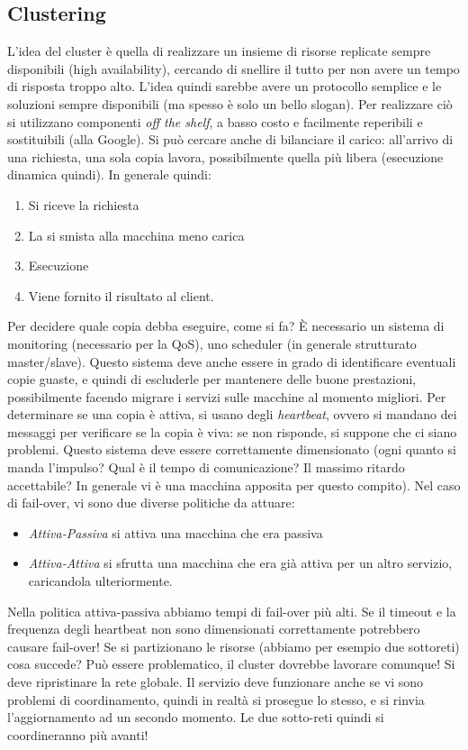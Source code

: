 \subsection{Clustering}
L'idea del cluster è quella di realizzare un insieme di risorse replicate 
sempre disponibili (high availability),
cercando di snellire il tutto per non avere un tempo di risposta troppo alto. 
L'idea quindi sarebbe avere un protocollo
semplice e le soluzioni sempre disponibili (ma spesso è solo un bello slogan).
Per realizzare ciò si utilizzano componenti \textit{off the shelf}, a basso 
costo e facilmente reperibili e
sostituibili (alla Google). Si può cercare anche di bilanciare il carico: 
all'arrivo di una richiesta, una sola copia
lavora, possibilmente quella più libera (esecuzione dinamica quindi). In 
generale quindi:
\begin{enumerate}
 \item Si riceve la richiesta
 \item La si smista alla macchina meno carica
 \item Esecuzione
 \item Viene fornito il risultato al client.
\end{enumerate}
Per decidere quale copia debba eseguire, come si fa? È necessario un sistema di 
monitoring (necessario per la QoS),
uno scheduler (in generale strutturato master/slave). Questo sistema deve anche 
essere in grado di identificare
eventuali copie guaste, e quindi di escluderle per mantenere delle buone 
prestazioni, possibilmente facendo migrare i
servizi sulle macchine al momento migliori. Per determinare se una copia è 
attiva, si usano degli \textit{heartbeat},
ovvero si mandano dei messaggi per verificare se la copia è viva: se non 
risponde, si suppone che ci siano problemi.
Questo sistema deve essere correttamente dimensionato (ogni quanto si manda 
l'impulso? Qual è il tempo di
comunicazione? Il massimo ritardo accettabile? In generale vi è una macchina 
apposita per questo compito).
Nel caso di fail-over, vi sono due diverse politiche da attuare:
\begin{itemize}
 \item \textit{Attiva-Passiva} si attiva una macchina che era passiva
 \item \textit{Attiva-Attiva} si sfrutta una macchina che era già attiva
 per un altro servizio, caricandola ulteriormente.
\end{itemize}
Nella politica attiva-passiva abbiamo tempi di fail-over più alti.
Se il timeout e la frequenza degli heartbeat non sono dimensionati
correttamente potrebbero causare fail-over!
Se si partizionano le risorse (abbiamo per esempio due sottoreti) cosa succede? 
Può essere problematico, il cluster
dovrebbe lavorare comunque! Si deve ripristinare la rete globale. Il servizio 
deve funzionare anche se vi sono problemi
di coordinamento, quindi in realtà si prosegue lo stesso, e si rinvia 
l'aggiornamento ad un secondo momento. Le due
sotto-reti quindi si coordineranno più avanti!
